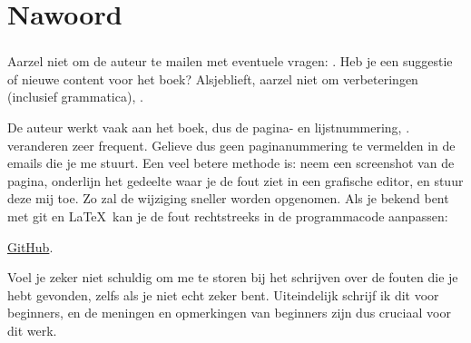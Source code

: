 \part*{Nawoord}

\section{\NLph{}}

Aarzel niet om de auteur te mailen met eventuele vragen: \GTT{<\EMAIL>}.
Heb je een suggestie of nieuwe content voor het boek?
Alsjeblieft, aarzel niet om verbeteringen (inclusief grammatica), \etc.

De auteur werkt vaak aan het boek, dus de pagina- en lijstnummering, \etc. veranderen zeer frequent.
Gelieve dus geen paginanummering te vermelden in de emails die je me stuurt.
Een veel betere methode is: neem een screenshot van de pagina, onderlijn het gedeelte waar je de fout ziet in een grafische editor,
en stuur deze mij toe. Zo zal de wijziging sneller worden opgenomen.
Als je bekend bent met git en \LaTeX\, kan je de fout rechtstreeks in de programmacode aanpassen:

\href{http://go.yurichev.com/17089}{GitHub}.

Voel je zeker niet schuldig om me te storen bij het schrijven over de fouten die je hebt gevonden, zelfs als je niet echt zeker bent.
Uiteindelijk schrijf ik dit voor beginners, en de meningen en opmerkingen van beginners zijn dus cruciaal voor dit werk.

